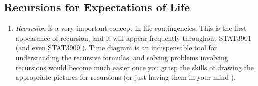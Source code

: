 \subsection{Recursions for Expectations of Life}
\label{subsect:life-exp-recurs}
\begin{enumerate}
\item \emph{Recursion} is a very important concept in life contingencies. This
is the first appearance of recursion, and it will appear frequently throughout
STAT3901 (and even STAT3909!). Time diagram is an indispensable tool for
understanding the recursive formulas, and solving problems involving recursions
would become much easier  once you grasp the skills
of drawing the appropriate pictures for recursions (or just having them in your
mind ).


\end{enumerate}
